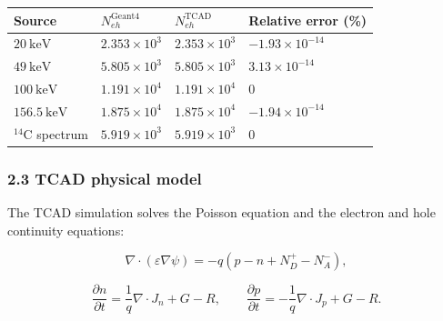 \documentclass[
  10pt,
  a4paper,
]{article}
\newcounter{none} %
\begin{document}
{\def\LTcaptype{none} %
\begin{longtable}[]{@{}
  >{\centering\arraybackslash}p{}
  >{\raggedleft\arraybackslash}p{}
  >{\raggedleft\arraybackslash}p{}
  >{\raggedleft\arraybackslash}p{}@{}}
\toprule\noalign{}
\begin{minipage}[b]{\linewidth}\centering
Source
\end{minipage} & \begin{minipage}[b]{\linewidth}\raggedleft
\(N_{eh}^{\mathrm{Geant4}}\)
\end{minipage} & \begin{minipage}[b]{\linewidth}\raggedleft
\(N_{eh}^{\mathrm{TCAD}}\)
\end{minipage} & \begin{minipage}[b]{\linewidth}\raggedleft
Relative error (\%)
\end{minipage} \\
\midrule\noalign{}
\endhead
\bottomrule\noalign{}
\endlastfoot
\(20\ \mathrm{keV}\) & \(2.353\times10^3\) & \(2.353\times10^3\) &
\(-1.93\times10^{-14}\) \\
\(49\ \mathrm{keV}\) & \(5.805\times10^3\) & \(5.805\times10^3\) &
\(3.13\times10^{-14}\) \\
\(100\ \mathrm{keV}\) & \(1.191\times10^4\) & \(1.191\times10^4\) &
\(0\) \\
\(156.5\ \mathrm{keV}\) & \(1.875\times10^4\) & \(1.875\times10^4\) &
\(-1.94\times10^{-14}\) \\
\(^{14}\mathrm{C}\) spectrum & \(5.919\times10^3\) & \(5.919\times10^3\)
& \(0\) \\
\end{longtable}
}

\subsubsection{2.3 TCAD physical model}\label{tcad-physical-model}

The TCAD simulation solves the Poisson equation and the electron and
hole continuity equations:

\[
\nabla\cdot(\varepsilon\nabla\psi)=-q(p-n+N_D^+-N_A^-),
\]

\[
\frac{\partial n}{\partial t}=\frac{1}{q}\nabla\cdot J_n+G-R,\qquad
\frac{\partial p}{\partial t}=-\frac{1}{q}\nabla\cdot J_p+G-R.
\]
\end{document}
